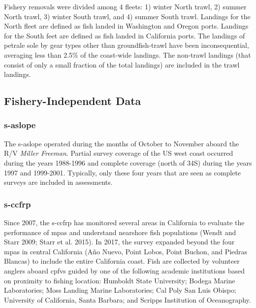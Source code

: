 \documentclass[11pt,
  english,
  letterpaper,
]{article}
\begin{document}
Fishery removals were divided among 4 fleets: 1) winter North trawl, 2) summer North trawl, 3) winter South trawl, and 4) summer South trawl. Landings for the North fleet are defined as fish landed in Washington and Oregon ports. Landings for the South feet are defined as fish landed in California ports. The landings of petrale sole by gear types other than groundfish-trawl have been inconsequential, averaging less than 2.5\% of the coast-wide landings. The non-trawl landings (that consist of only a small fraction of the total landings) are included in the trawl landings.

\hypertarget{fishery-independent-data}{%
\subsection{Fishery-Independent Data}\label{fishery-independent-data}}

\hypertarget{section}{%
\subsubsection{\texorpdfstring{\acrlong{s-aslope}}{}}\label{section}}

The \gls{s-aslope} operated during the months of October to November aboard the R/V \emph{Miller Freeman}. Partial survey coverage of the US west coast occurred during the years 1988-1996 and complete coverage (north of 34\textquotesingle S) during the years 1997 and 1999-2001. Typically, only these four years that are seen as complete surveys are included in assessments.

\hypertarget{section-1}{%
\subsubsection{\texorpdfstring{\acrlong{s-ccfrp}}{}}\label{section-1}}

Since 2007, the \gls{s-ccfrp} has monitored several areas in California to evaluate the performance of \glspl{mpa} and understand nearshore fish populations (Wendt and Starr 2009; Starr et al. 2015). In 2017, the survey expanded beyond the four \Gls{mpa}s in central California (Año Nuevo, Point Lobos, Point Buchon, and Piedras Blancas) to include the entire California coast. Fish are collected by volunteer anglers aboard \glspl{cpfv} guided by one of the following academic institutions based on proximity to fishing location: Humboldt State University; Bodega Marine Laboratories; Moss Landing Marine Laboratories; Cal Poly San Luis Obispo; University of California, Santa Barbara; and Scripps Institution of Oceanography.
\end{document}
